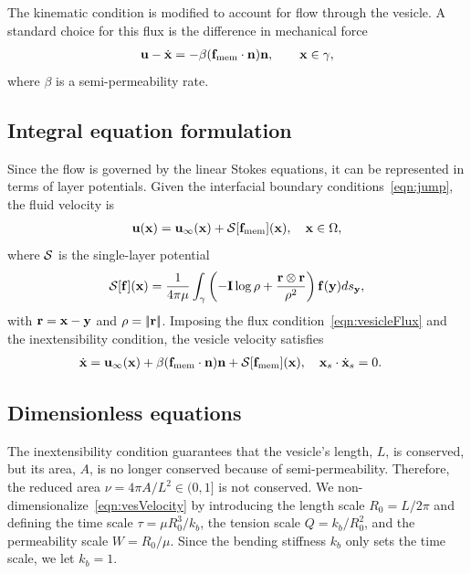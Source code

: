 \documentclass[9pt,twocolumn,twoside,lineno]{pnas-new}
\begin{document}
The kinematic condition is modified to account for flow through the
vesicle. A standard choice for this flux is the difference in mechanical
force~\cite{yao-mor2017}
\begin{align}
  \label{eqn:vesicleFlux}
  \mathbf{u} - \dot{\mathbf{x}} = - \beta (\mathbf{f}_\mathrm{mem} \cdot \mathbf{n}) \mathbf{n}, \qquad
  \mathbf{x} \in \gamma,
\end{align}
where $\beta$ is a semi-permeability rate.  


\subsection*{Integral equation formulation}
Since the flow is governed by the linear Stokes equations, it can be
represented in terms of layer potentials. Given the interfacial boundary
conditions~\eqref{eqn:jump}, the fluid velocity is
\begin{align}
  \mathbf{u}(\mathbf{x}) = \mathbf{u}_\infty(\mathbf{x}) + \mathcal{S}[\mathbf{f}_\mathrm{mem}](\mathbf{x}), \quad
    \mathbf{x} \in \Omega,
\end{align}
where $\mathcal{S}$ is the single-layer potential
\begin{align}
  \mathcal{S}[\mathbf{f}](\mathbf{x}) = \frac{1}{4\pi\mu} \int_{\gamma} \left(
    -\mathbf{I} \log\rho + \frac{\mathbf{r} \otimes \mathbf{r}}{\rho^2} \right)
    \mathbf{f}(\mathbf{y}) ds_{\mathbf{y}},
\end{align}
with $\mathbf{r} = \mathbf{x} - \mathbf{y}$ and $\rho = |\!| \mathbf{r} |\!|$. Imposing the flux
condition~\eqref{eqn:vesicleFlux} and the inextensibility condition, the
vesicle velocity satisfies
\begin{align}
  \label{eqn:vesVelocity}
  \dot{\mathbf{x}} &= \mathbf{u}_\infty(\mathbf{x}) + \beta (\mathbf{f}_\mathrm{mem}\cdot\mathbf{n})\mathbf{n}
  + \mathcal{S} [\mathbf{f}_\mathrm{mem}](\mathbf{x}),  \quad
  \mathbf{x}_s \cdot \dot{\mathbf{x}}_s = 0.
\end{align}

\subsection*{Dimensionless equations}
The inextensibility condition guarantees that the vesicle's length, $L$,
is conserved, but its area, $A$, is no longer conserved because of
semi-permeability. Therefore, the reduced area $\nu = 4\pi A/L^2 \in
(0,1]$ is not conserved. We non-dimensionalize~\eqref{eqn:vesVelocity}
by introducing the length scale $R_0 = L/2\pi$ and defining the time
scale $\tau = \mu R_0^3/k_b$, the tension scale $Q = k_b/R_0^2$, and the
permeability scale $W = R_0/\mu$. Since the bending stiffness $k_b$ only
sets the time scale, we let $k_b=1$.
\end{document}
